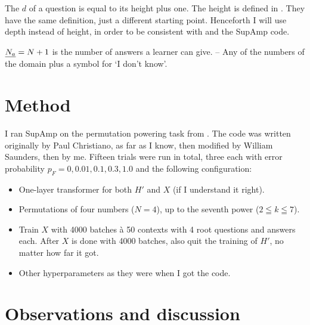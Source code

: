 \documentclass{farlamp}
\begin{document}
The  $d$ of a question is equal to its height plus one. The height
is defined in \Overfail. They have the same definition, just a different
starting point. Henceforth I will use depth instead of height, in order to be
consistent with \textcite{CSASupAmp} and the SupAmp code.

$\underline{N_a} = N + 1$ is the number of answers a learner can give. – Any of the
numbers of the domain plus a symbol for ‘I don't know’.



\section{Method}

I ran SupAmp on the permutation powering task from \textcite{CSASupAmp}. The
code was written originally by Paul Christiano, as far as I know, then modified
by William Saunders, then by me. Fifteen trials were run in total, three each
with error probability $p_F = 0, 0.01, 0.1, 0.3, 1.0$ and the following
configuration:

\begin{itemize}
    \item One-layer transformer for both $H'$ and $X$ (if I understand it
        right).
    \item Permutations of four numbers ($N = 4$), up to the seventh power ($2
        \leqq k \leqq 7$).
    \item Train $X$ with 4000 batches à 50 contexts with 4 root questions and
        answers each. After $X$ is done with 4000 batches, also quit the
        training of $H'$, no matter how far it got.
    \item Other hyperparameters as they were when I got the code.
\end{itemize}



\section{Observations and discussion}
\end{document}
